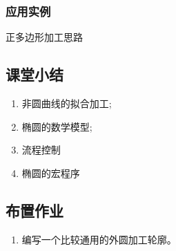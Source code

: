 \subsubsection{应用实例}
正多边形加工思路


\subsection{课堂小结}
\begin{enumerate}[1、]
	\item 非圆曲线的拟合加工;
	\item 椭圆的数学模型;
	\item 流程控制
	\item 椭圆的宏程序
\end{enumerate}

\vfill
\subsection{布置作业}
\begin{enumerate}[1、]
	\item 编写一个比较通用的外圆加工轮廓。 
\end{enumerate}
\vfill
